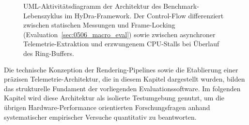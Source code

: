 \begin{figure}[htbp]
{
    }
    \caption[UML-Aktivitätsdiagramm der Architektur des Benchmark-Lebenszyklus]
    {UML-Aktivitätsdiagramm der Architektur des Benchmark-Lebenszyklus im HyDra-Framework.
    Der Control-Flow differenziert zwischen statischen Messungen und Frame-Locking (Evaluation~\ref{sec:0506_macro_eval})
        sowie zwischen asynchroner Telemetrie-Extraktion und erzwungenem CPU-Stalls bei Überlauf des Ring-Buffers.}
    \label{fig:macro_telemetry_flow}
\end{figure}

Die technische Konzeption der Rendering-Pipelines sowie die Etablierung einer präzisen Telemetrie-Architektur, die in
diesem Kapitel dargestellt wurden, bilden das strukturelle Fundament der vorliegenden Evaluationssoftware.
Im folgenden Kapitel wird diese Architektur als isolierte Testumgebung genutzt, um die übrigen Hardware-Performance
orientierten Forschungsfragen anhand systematischer empirischer Versuche quantitativ zu beantworten.